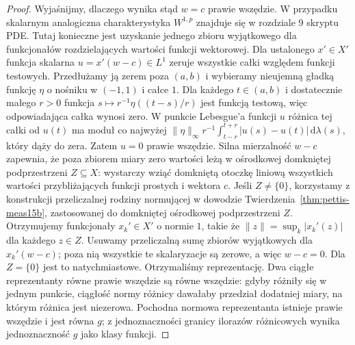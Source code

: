 \begin{proof}
Wyjaśnijmy, dlaczego wynika stąd $w=c$ prawie wszędzie.
W przypadku skalarnym analogiczna charakterystyka
$W^{1,p}$ znajduje się w rozdziale 9 skryptu PDE.
Tutaj konieczne jest uzyskanie jednego zbioru
wyjątkowego dla funkcjonałów rozdzielających wartości
funkcji wektorowej.
Dla ustalonego $x'\in X'$ funkcja skalarna
$u=x'(w-c)\in L^1$ zeruje wszystkie całki względem
funkcji testowych. Przedłużamy ją zerem poza $(a,b)$
i wybieramy nieujemną gładką funkcję $\eta$ o nośniku
w $(-1,1)$ i całce $1$. Dla każdego $t\in(a,b)$
i dostatecznie małego $r>0$ funkcja
$s\mapsto r^{-1}\eta((t-s)/r)$ jest funkcją testową,
więc odpowiadająca całka wynosi zero. W punkcie
Lebesgue'a funkcji $u$ różnica tej całki od $u(t)$
ma moduł co najwyżej
$\|\eta\|_\infty r^{-1}\int_{t-r}^{t+r}|u(s)-u(t)|\,\mathrm d\lambda(s)$,
który dąży do zera. Zatem $u=0$ prawie wszędzie.
Silna mierzalność $w-c$ zapewnia, że poza zbiorem
miary zero wartości leżą w ośrodkowej domkniętej
podprzestrzeni $Z\subseteq X$: wystarczy wziąć
domkniętą otoczkę liniową wszystkich wartości
przybliżających funkcji prostych i wektora $c$.
Jeśli $Z\ne\{0\}$, korzystamy z konstrukcji przeliczalnej
rodziny normującej w dowodzie Twierdzenia~\ref{thm:pettis-meas15b},
zastosowanej do domkniętej ośrodkowej podprzestrzeni $Z$.
Otrzymujemy funkcjonały $x_k'\in X'$ o normie $1$, takie że
$\|z\|=\sup_k|x_k'(z)|$ dla każdego $z\in Z$.
Usuwamy przeliczalną sumę zbiorów wyjątkowych dla
$x_k'(w-c)$; poza nią wszystkie te skalaryzacje
są zerowe, a więc $w-c=0$. Dla $Z=\{0\}$ jest to
natychmiastowe. Otrzymaliśmy reprezentację.
Dwa ciągłe reprezentanty równe prawie wszędzie
są równe wszędzie: gdyby różniły się w jednym punkcie,
ciągłość normy różnicy dawałaby przedział dodatniej
miary, na którym różnica jest niezerowa.
Pochodna normowa reprezentanta istnieje prawie
wszędzie i jest równa $g$; z jednoznaczności granicy
ilorazów różnicowych wynika jednoznaczność $g$
jako klasy funkcji.
\end{proof}

